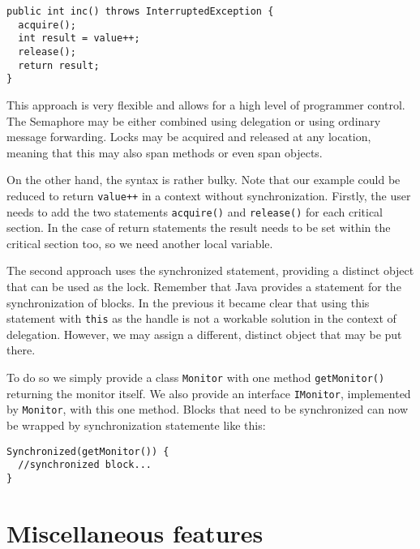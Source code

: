 \documentclass[a4paper,12pt]{book}
\begin{document}
\begin{verbatim}
public int inc() throws InterruptedException {
  acquire();
  int result = value++;
  release();
  return result;
}
\end{verbatim}

This approach is very flexible and allows for a high level of programmer control. The Semaphore may be either combined using delegation or using ordinary message forwarding. Locks may be acquired and released at any location, meaning that this may also span methods or even span objects.

On the other hand, the syntax is rather bulky. Note that our example could be reduced to return \verb|value++| in a context without synchronization. Firstly, the user needs to add the two statements \verb|acquire()| and \verb|release()| for each critical section. In the case of return statements the result needs to be set within the critical section too, so we need another local variable.

The second approach uses the synchronized statement, providing a distinct object that can be used as the lock. Remember that Java provides a statement for the synchronization of blocks. In the previous it became clear that using this statement with \verb|this| as the handle is not a workable solution in the context of delegation. However, we may assign a different, distinct object that may be put there. 

To do so we simply provide a class \verb|Monitor| with one method \verb|getMonitor()| returning the monitor itself. We also provide an interface \verb|IMonitor|, implemented by \verb|Monitor|, with this one method. Blocks that need to be synchronized can now be wrapped by synchronization statemente like this:

\begin{verbatim}
Synchronized(getMonitor()) {
  //synchronized block...
}
\end{verbatim}



\chapter{Miscellaneous features}
\end{document}
